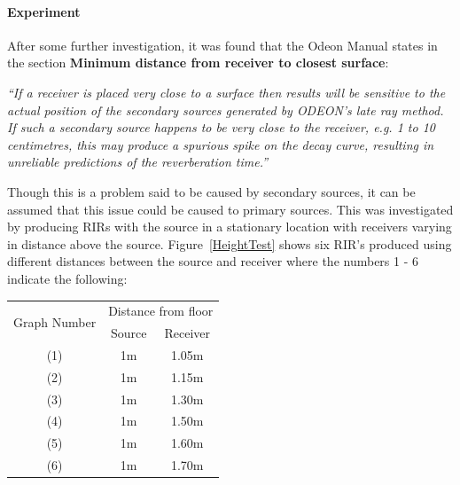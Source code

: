 \documentclass[../../main.tex]{subfiles}
\begin{document}
			\paragraph{Experiment}
			After some further investigation, it was found that the Odeon Manual \cite{odeonManual} states in the section \textbf{Minimum distance from receiver to closest surface}:

			 \vspace{5mm}
			 \begin{center}
			 \begin{minipage}{0.75\textwidth}
			 \textit{``If a receiver is placed very close to a surface then results will be sensitive to the actual position of the secondary sources generated by ODEON’s late ray method. If such a secondary source happens to be very close to the receiver, e.g. 1 to 10 centimetres, this may produce a spurious spike on the decay curve, resulting in unreliable predictions of the reverberation time.''}
			 \end{minipage}
			 \end{center}
			 \vspace{5mm}

			 Though this is a problem said to be caused by secondary sources, it can be assumed that this issue could be caused to primary sources. This was investigated by producing RIRs with the source in a stationary location with receivers varying in distance above the source. Figure~\ref{HeightTest} shows six \ac{RIR}'s produced using different distances between the source and receiver where the numbers 1 - 6 indicate the following:

			 \begin{center}
				 \begin{tabular}{|c |c| c|}
				 \hline
				 \multirow{2}{*}{Graph Number} & \multicolumn{2}{|c|}{Distance from floor} \\ \cline{2-3}
				 & Source & Receiver \\\hline
				 (1) & 1m & 1.05m \\
				 (2) & 1m & 1.15m \\
				 (3) & 1m & 1.30m \\
				 (4) & 1m & 1.50m \\
				 (5) & 1m & 1.60m \\
				 (6) & 1m & 1.70m \\ \hline
				 \end{tabular}
			 \end{center}
\end{document}
